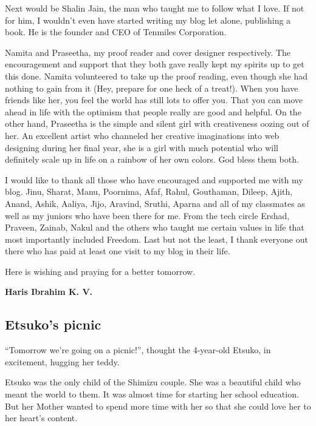 \documentclass[twoside,11pt,titlepage]{article}
\begin{document}
Next would be Shalin Jain, the man who taught me to follow what I love. If not for him, I wouldn't even have started writing my blog let alone, publishing a book. He is the founder and CEO of Tenmiles Corporation.

Namita and Praseetha, my proof reader and cover designer respectively. The encouragement and support that they both gave really kept my spirits up to get this done. Namita volunteered to take up the proof reading, even though she had nothing to gain from it (Hey, prepare for one heck of a treat!). When you have friends like her, you feel the world has still lots to offer you. That you can move ahead in life with the optimism that people really are good and helpful. On the other hand, Praseetha is the simple and silent girl with creativeness oozing out of her. An excellent artist who channeled her creative imaginations into web designing during her final year, she is a girl with much potential who will definitely scale up in life on a rainbow of her own colors. God bless them both.

I would like to thank all those who have encouraged and supported me with my blog. Jinu, Sharat, Manu, Poornima, Afaf, Rahul, Gouthaman, Dileep, Ajith, Anand, Ashik, Aaliya, Jijo, Aravind, Sruthi, Aparna and all of my classmates as well as my juniors who have been there for me. From the tech circle Ershad, Praveen, Zainab, Nakul and the others who taught me certain values in life that most importantly included Freedom. Last but not the least, I thank everyone out there who has paid at least one visit to my blog in their life.

Here is wishing and praying for a better tomorrow.

\textbf{Haris Ibrahim K. V.}


\newpage
\begin{center}
  \section{Etsuko's picnic}
\end{center}
\bigskip
\bigskip
\bigskip
``Tomorrow we're going on a picnic!'', thought the 4-year-old Etsuko, in excitement, hugging her teddy.

Etsuko was the only child of the Shimizu couple. She was a beautiful child who meant the world to them. It was almost time for starting her school education. But her Mother wanted to spend more time with her so that she could love her to her heart's content.
\end{document}
